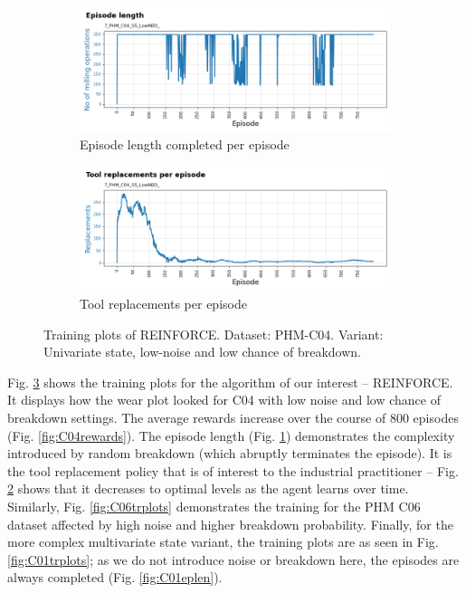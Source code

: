 \documentclass[a4paper, 12pt]{article}
\begin{document}
\begin{figure}[h]
	\begin{subfigure}[b]{0.5\textwidth}
		\centering
		\includegraphics[width=\textwidth]{images/TrainingPlots/7_PHM_C04_SS_LowNBD__Episode_Length.png}  
		\caption{Episode length completed per episode}
		\label{fig:C04eplen}
	\end{subfigure}
	\hfill
	\begin{subfigure}[b]{0.5\textwidth}
		\centering
		\includegraphics[width=\textwidth]{images/TrainingPlots/7_PHM_C04_SS_LowNBD__Tool_Replacements.png}  
		\caption{Tool replacements per episode}
		\label{fig:C04toolrep}
	\end{subfigure} 
	\caption{Training plots of REINFORCE. Dataset: PHM-C04. Variant: Univariate state, low-noise and low chance of breakdown.}
	\label{fig:C04trplots}
\end{figure}
Fig. \ref{fig:C04trplots} shows the training plots for the algorithm of our interest -- REINFORCE. It displays how the wear plot looked for C04 with low noise and low chance of breakdown settings. The average rewards increase over the course of 800 episodes (Fig. \ref{fig:C04rewards}). The episode length (Fig. \ref{fig:C04eplen}) demonstrates the complexity introduced by random breakdown (which abruptly terminates the episode). It is the tool replacement policy that is of interest to the industrial practitioner -- Fig. \ref{fig:C04toolrep} shows that it decreases to optimal levels as the agent learns over time. Similarly, Fig. \ref{fig:C06trplots} demonstrates the training for the PHM C06 dataset affected by high noise and higher breakdown probability. Finally, for the more complex multivariate state variant, the training plots are as seen in Fig. \ref{fig:C01trplots}; as we do not introduce noise or breakdown here, the episodes are always completed (Fig. \ref{fig:C01eplen}).
\end{document}
